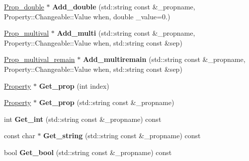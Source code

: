\begin{DoxyCompactItemize}
\item 
\hypertarget{classSection__prop_a4bf7d7f3f55b561d75e17a051506f1e4}{\hyperlink{classProp__double}{Prop\-\_\-double} $\ast$ {\bfseries Add\-\_\-double} (std\-::string const \&\-\_\-propname, Property\-::\-Changeable\-::\-Value when, double \-\_\-value=0.)}\label{classSection__prop_a4bf7d7f3f55b561d75e17a051506f1e4}

\item 
\hypertarget{classSection__prop_a5e13d1fd48e06f1422b453ddb8295cce}{\hyperlink{classProp__multival}{Prop\-\_\-multival} $\ast$ {\bfseries Add\-\_\-multi} (std\-::string const \&\-\_\-propname, Property\-::\-Changeable\-::\-Value when, std\-::string const \&sep)}\label{classSection__prop_a5e13d1fd48e06f1422b453ddb8295cce}

\item 
\hypertarget{classSection__prop_a28af543dfeec843e42c4d727c1fcc872}{\hyperlink{classProp__multival__remain}{Prop\-\_\-multival\-\_\-remain} $\ast$ {\bfseries Add\-\_\-multiremain} (std\-::string const \&\-\_\-propname, Property\-::\-Changeable\-::\-Value when, std\-::string const \&sep)}\label{classSection__prop_a28af543dfeec843e42c4d727c1fcc872}

\item 
\hypertarget{classSection__prop_a0c5c7660c469b8182a35e538a061d32e}{\hyperlink{classProperty}{Property} $\ast$ {\bfseries Get\-\_\-prop} (int index)}\label{classSection__prop_a0c5c7660c469b8182a35e538a061d32e}

\item 
\hypertarget{classSection__prop_aa915bd1cd5f1026fa050fee618cb2d02}{\hyperlink{classProperty}{Property} $\ast$ {\bfseries Get\-\_\-prop} (std\-::string const \&\-\_\-propname)}\label{classSection__prop_aa915bd1cd5f1026fa050fee618cb2d02}

\item 
\hypertarget{classSection__prop_ab2f0390255ebba00eabae922b10666c0}{int {\bfseries Get\-\_\-int} (std\-::string const \&\-\_\-propname) const }\label{classSection__prop_ab2f0390255ebba00eabae922b10666c0}

\item 
\hypertarget{classSection__prop_a4fff92d2ce913ece6db7267acb32cbd2}{const char $\ast$ {\bfseries Get\-\_\-string} (std\-::string const \&\-\_\-propname) const }\label{classSection__prop_a4fff92d2ce913ece6db7267acb32cbd2}

\item 
\hypertarget{classSection__prop_aaeba2edf839ba6d0a3514865170c1c67}{bool {\bfseries Get\-\_\-bool} (std\-::string const \&\-\_\-propname) const }\label{classSection__prop_aaeba2edf839ba6d0a3514865170c1c67}


\end{DoxyCompactItemize}
